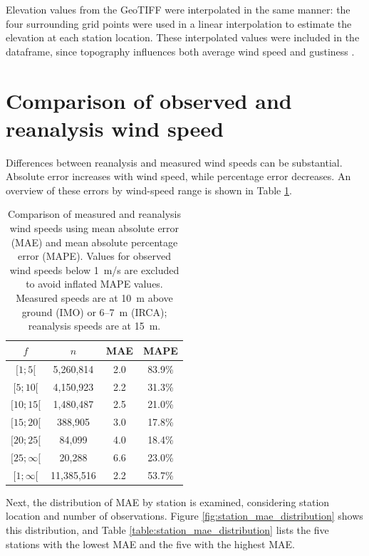 Elevation values from the GeoTIFF were interpolated in the same manner: the four surrounding grid points were used in a linear interpolation to estimate the elevation at each station location. These interpolated values were included in the dataframe, since topography influences both average wind speed and gustiness \cite{GNP_vidtal}.

\section{Comparison of observed and reanalysis wind speed}

Differences between reanalysis and measured wind speeds can be substantial. Absolute error increases with wind speed, while percentage error decreases. An overview of these errors by wind-speed range is shown in Table \ref{table:measuredVSReanalysis_wind_speed}.

\begin{table}[h]
  \centering
  \caption[Measured vs.\ reanalysis wind-speed errors]{Comparison of measured and reanalysis wind speeds using mean absolute error (MAE) and mean absolute percentage error (MAPE). Values for observed wind speeds below 1~m/s are excluded to avoid inflated MAPE values. Measured speeds are at 10~m above ground (IMO) or 6–7~m (IRCA); reanalysis speeds are at 15~m.}
  \label{table:measuredVSReanalysis_wind_speed}
  \begin{tabular}{cccc}
    \toprule
    $f$ & $n$ & MAE & MAPE \\
    \midrule
    $[1; 5[$     & 5,260,814  & 2.0 & 83.9\% \\
    $[5; 10[$    & 4,150,923  & 2.2 & 31.3\% \\
    $[10; 15[$   & 1,480,487  & 2.5 & 21.0\% \\
    $[15; 20[$   &   388,905  & 3.0 & 17.8\% \\
    $[20; 25[$   &    84,099  & 4.0 & 18.4\% \\
    $[25; \infty[$ &   20,288 & 6.6 & 23.0\% \\
    $[1; \infty[$  &11,385,516 & 2.2 & 53.7\% \\
    \bottomrule
  \end{tabular}
\end{table}

Next, the distribution of MAE by station is examined, considering station location and number of observations. Figure \ref{fig:station_mae_distribution} shows this distribution, and Table \ref{table:station_mae_distribution} lists the five stations with the lowest MAE and the five with the highest MAE.

